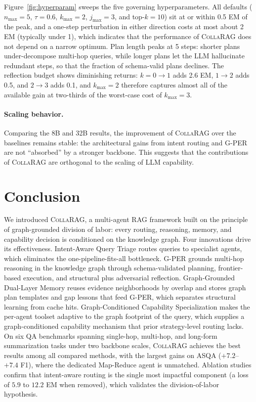 \documentclass[11pt,a4paper]{article}
\newcommand{\sys}{\textsc{CollaRAG}}
\begin{document}
Figure~\ref{fig:hyperparam} sweeps the five governing hyperparameters.
All defaults ($n_{\max}{=}5$, $\tau{=}0.6$, $k_{\max}{=}2$, $j_{\max}{=}3$, and top-$k{=}10$) sit at or within 0.5 EM of the peak, and a one-step perturbation in either direction costs at most about 2 EM (typically under 1), which indicates that the performance of \sys{} does not depend on a narrow optimum.
Plan length peaks at 5 steps: shorter plans under-decompose multi-hop queries, while longer plans let the LLM hallucinate redundant steps, so that the fraction of schema-valid plans declines.
The reflection budget shows diminishing returns: $k{=}0\!\to\!1$ adds 2.6 EM, $1\!\to\!2$ adds 0.5, and $2\!\to\!3$ adds 0.1, and $k_{\max}{=}2$ therefore captures almost all of the available gain at two-thirds of the worst-case cost of $k_{\max}{=}3$.

\paragraph{Scaling behavior.}
Comparing the 8B and 32B results, the improvement of \sys{} over the baselines remains stable: the architectural gains from intent routing and G-PER are not ``absorbed'' by a stronger backbone.
This suggests that the contributions of \sys{} are orthogonal to the scaling of LLM capability.

\section{Conclusion}
\label{sec:conclusion}

We introduced \sys{}, a multi-agent RAG framework built on the principle of graph-grounded division of labor: every routing, reasoning, memory, and capability decision is conditioned on the knowledge graph.
Four innovations drive its effectiveness.
Intent-Aware Query Triage routes queries to specialist agents, which eliminates the one-pipeline-fits-all bottleneck.
G-PER grounds multi-hop reasoning in the knowledge graph through schema-validated planning, frontier-based execution, and structural plus adversarial reflection.
Graph-Grounded Dual-Layer Memory reuses evidence neighborhoods by overlap and stores graph plan templates and gap lessons that feed G-PER, which separates structural learning from cache hits.
Graph-Conditioned Capability Specialization makes the per-agent toolset adaptive to the graph footprint of the query, which supplies a graph-conditioned capability mechanism that prior strategy-level routing lacks.
On six QA benchmarks spanning single-hop, multi-hop, and long-form summarization tasks under two backbone scales, \sys{} achieves the best results among all compared methods, with the largest gains on ASQA ($+7.2$--$+7.4$ F1), where the dedicated Map-Reduce agent is unmatched.
Ablation studies confirm that intent-aware routing is the single most impactful component (a loss of $5.9$ to $12.2$ EM when removed), which validates the division-of-labor hypothesis.
\end{document}
